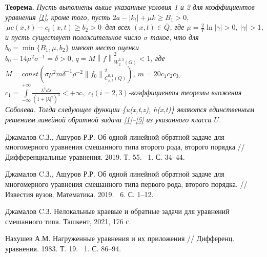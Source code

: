 {\bf Теорема.} {\it Пусть выполнены выше указанные условия 1 и 2 для коэффициентов уравнения \eqref{1}, кроме того, пусть
$2a-\left|k_{t}\right|+\mu k\geq B_{1}>0,$ $\,\mu c(x,t)-c_{t}(x,t) \ge b_{2}>0$\, для всех  $(x,t)\in \overline{Q}$, где $\mu=\frac{2}{T} \ln \left|\gamma \right|>0,\: \left|\gamma \right|>1$, и пусть существует положительное число  $\sigma$ такое, что для $b_{0}=\min \{B_{1},\mu,b_{2}\}$ имеют место оценки  $b_{0}-14\mu^{2}\sigma^{-1}=\delta>0, \, q=M \left\|f\right\|^{2}_{W_{2}^{3,3}(G)}<1$, где $M=const\left(\sigma\mu^{2}m\delta^{-1}\rho^{-2}\left\|f_{0}\right\|^{2}_{C_{x,t}^{0,1}(Q)}\right)$,  $m=20c_{1}c_{2}c_{3}$, $c_{1}=\int\limits_{-\infty}^{+\infty}\frac{\lambda^{4}d\lambda}{\left(1+|\lambda|^{2}\right)^{3}}<+\infty,\, \, c_{i}(i=2,3)$-коэффициенты теоремы вложения Соболева. Тогда следующее функции \{u(x,t,z),\; h(x,t)\} являются единственным решением линейной обратной задачи \eqref{1}--\eqref{5} из указанного класса $U$.}

\begin{thebibliography}{9} %

 Джамалов C.З., Ашуров Р.Р. Об одной линейной обратной задаче для многомерного уравнения смешанного типа второго рода, второго порядка // Дифференциальные уравнения.  2019. Т. 55. \textnumero ~1. С. 34--44.

 Джамалов C.З., Ашуров Р.Р. Об одной линейной обратной задаче для многомерного уравнения смешанного типа первого рода, второго порядка. // Известия вузов. Математика. 2019. \textnumero ~6. С. 1--12.

 Джамалов C.З. Нелокальные краевые и обратные задачи для уравнений смешанного типа. Ташкент, 2021, 176 с.

 Нахушев А.М. Нагруженные уравнения и их приложения // Дифференц. уравнения. 1983.  Т. 19. \textnumero ~1. С. 86--94.





\end{thebibliography}




%
